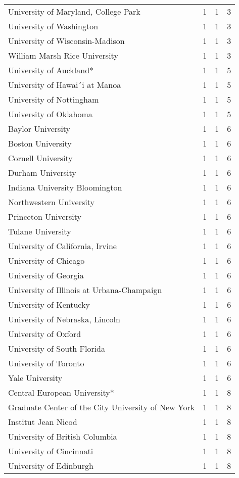 \begin{longtable}[t]{llll}
University of Maryland, College Park & 1 & 1 & 3\\
\addlinespace
University of Washington & 1 & 1 & 3\\
University of Wisconsin-Madison & 1 & 1 & 3\\
William Marsh Rice University & 1 & 1 & 3\\
University of Auckland* & 1 & 1 & 5\\
University of Hawai´i at Manoa & 1 & 1 & 5\\
\addlinespace
University of Nottingham & 1 & 1 & 5\\
University of Oklahoma & 1 & 1 & 5\\
Baylor University & 1 & 1 & 6\\
Boston University & 1 & 1 & 6\\
Cornell University & 1 & 1 & 6\\
\addlinespace
Durham University & 1 & 1 & 6\\
Indiana University Bloomington & 1 & 1 & 6\\
Northwestern University & 1 & 1 & 6\\
Princeton University & 1 & 1 & 6\\
Tulane University & 1 & 1 & 6\\
\addlinespace
University of California, Irvine & 1 & 1 & 6\\
University of Chicago & 1 & 1 & 6\\
University of Georgia & 1 & 1 & 6\\
University of Illinois at Urbana-Champaign & 1 & 1 & 6\\
University of Kentucky & 1 & 1 & 6\\
\addlinespace
University of Nebraska, Lincoln & 1 & 1 & 6\\
University of Oxford & 1 & 1 & 6\\
University of South Florida & 1 & 1 & 6\\
University of Toronto & 1 & 1 & 6\\
Yale University & 1 & 1 & 6\\
\addlinespace
Central European University* & 1 & 1 & 8\\
Graduate Center of the City University of New York & 1 & 1 & 8\\
Institut Jean Nicod & 1 & 1 & 8\\
University of British Columbia & 1 & 1 & 8\\
University of Cincinnati & 1 & 1 & 8\\
\addlinespace
University of Edinburgh & 1 & 1 & 8\\

\end{longtable}

